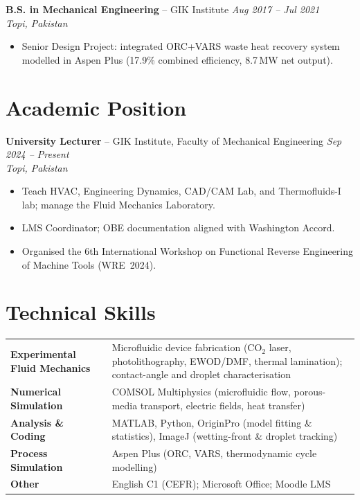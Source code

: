 \documentclass[11pt,a4paper]{article}
\begin{document}
\vspace{4pt}
\textbf{B.S. in Mechanical Engineering} -- GIK Institute
\hfill \textit{Aug 2017 -- Jul 2021}\\
\textit{Topi, Pakistan}
\begin{itemize}
  \item Senior Design Project: integrated ORC+VARS waste heat recovery system
        modelled in Aspen Plus (17.9\% combined efficiency, 8.7\,MW net output).
\end{itemize}

\section{Academic Position}

\textbf{University Lecturer} -- GIK Institute, Faculty of Mechanical Engineering
\hfill \textit{Sep 2024 -- Present}\\
\textit{Topi, Pakistan}
\begin{itemize}
  \item Teach HVAC, Engineering Dynamics, CAD/CAM Lab, and Thermofluids-I lab;
        manage the Fluid Mechanics Laboratory.
  \item LMS Coordinator; OBE documentation aligned with Washington Accord.
  \item Organised the 6th International Workshop on Functional Reverse Engineering
        of Machine Tools (WRE~2024).
\end{itemize}

\section{Technical Skills}

\begin{tabularx}{\textwidth}{@{}>{\bfseries}lX@{}}
Experimental Fluid Mechanics
  & Microfluidic device fabrication (CO$_2$ laser, photolithography, EWOD/DMF,
    thermal lamination); contact-angle and droplet characterisation \\[3pt]
Numerical Simulation
  & COMSOL Multiphysics (microfluidic flow, porous-media transport, electric
    fields, heat transfer) \\[3pt]
Analysis \& Coding
  & MATLAB, Python, OriginPro (model fitting \& statistics), ImageJ
    (wetting-front \& droplet tracking) \\[3pt]
Process Simulation
  & Aspen Plus (ORC, VARS, thermodynamic cycle modelling) \\[3pt]
Other
  & English C1 (CEFR); Microsoft Office; Moodle LMS \\
\end{tabularx}
\end{document}

